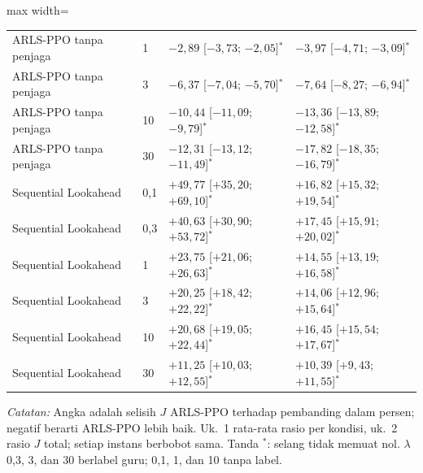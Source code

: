 \begin{table}[htbp]
\begin{adjustbox}{max width=\textwidth}
\begin{tabular}{llll}
ARLS-PPO tanpa penjaga & 1 & $-2{,}89$ [$-3{,}73$; $-2{,}05$]$^{*}$ & $-3{,}97$ [$-4{,}71$; $-3{,}09$]$^{*}$ \\
ARLS-PPO tanpa penjaga & 3 & $-6{,}37$ [$-7{,}04$; $-5{,}70$]$^{*}$ & $-7{,}64$ [$-8{,}27$; $-6{,}94$]$^{*}$ \\
ARLS-PPO tanpa penjaga & 10 & $-10{,}44$ [$-11{,}09$; $-9{,}79$]$^{*}$ & $-13{,}36$ [$-13{,}89$; $-12{,}58$]$^{*}$ \\
ARLS-PPO tanpa penjaga & 30 & $-12{,}31$ [$-13{,}12$; $-11{,}49$]$^{*}$ & $-17{,}82$ [$-18{,}35$; $-16{,}79$]$^{*}$ \\
\addlinespace
Sequential Lookahead & 0{,}1 & $+49{,}77$ [$+35{,}20$; $+69{,}10$]$^{*}$ & $+16{,}82$ [$+15{,}32$; $+19{,}54$]$^{*}$ \\
Sequential Lookahead & 0{,}3 & $+40{,}63$ [$+30{,}90$; $+53{,}72$]$^{*}$ & $+17{,}45$ [$+15{,}91$; $+20{,}02$]$^{*}$ \\
Sequential Lookahead & 1 & $+23{,}75$ [$+21{,}06$; $+26{,}63$]$^{*}$ & $+14{,}55$ [$+13{,}19$; $+16{,}58$]$^{*}$ \\
Sequential Lookahead & 3 & $+20{,}25$ [$+18{,}42$; $+22{,}22$]$^{*}$ & $+14{,}06$ [$+12{,}96$; $+15{,}64$]$^{*}$ \\
Sequential Lookahead & 10 & $+20{,}68$ [$+19{,}05$; $+22{,}44$]$^{*}$ & $+16{,}45$ [$+15{,}54$; $+17{,}67$]$^{*}$ \\
Sequential Lookahead & 30 & $+11{,}25$ [$+10{,}03$; $+12{,}55$]$^{*}$ & $+10{,}39$ [$+9{,}43$; $+11{,}55$]$^{*}$ \\
\bottomrule
\end{tabular}
\end{adjustbox}
\par\smallskip\footnotesize\textit{Catatan:} Angka adalah selisih $J$ ARLS-PPO terhadap pembanding dalam persen; negatif berarti ARLS-PPO lebih baik. Uk.~1 rata-rata rasio per kondisi, uk.~2 rasio $J$ total; setiap instans berbobot sama. Tanda $^{*}$: selang tidak memuat nol. $\lambda$ 0{,}3, 3, dan 30 berlabel guru; 0{,}1, 1, dan 10 tanpa label.
\end{table}
